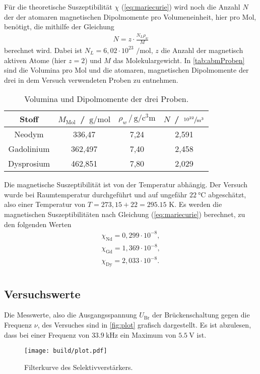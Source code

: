 \noindent
Für die theoretische Suszeptibilität $\chi$ (\ref{eq:mariecurie}) wird noch die Anzahl $N$ der der atomaren magnetischen Dipolmomente pro Volumeneinheit, hier pro Mol, benötigt, die mithilfe der Gleichung 
\begin{align*}
  N = z\cdot \frac{N_L \rho_w}{M}
\end{align*}
berechnet wird. Dabei ist $N_L = 6,02 \cdot 10^{23}$ $\si{\per\mole}$, $z$ die Anzahl der magnetisch aktiven Atome (hier $z=2$) und $M$ das Molekulargewicht.
In \autoref{tab:abmProben} sind die Volumina pro Mol und die atomaren, magnetischen Dipolmomente der drei in dem Versuch verwendeten Proben zu entnehmen.
\begin{table}[H]
  \centering
  \caption{Volumina und Dipolmomente der drei Proben.}
  \label{tab:abmProben}
  \begin{tabular}{c|c c c}
    \toprule
    Stoff & $M_{\text{Mol}}$ \,/\, $\si{\gram\per\mole}$ & $\rho_w \, / \, \si{\gram\per\cubic\centi\meter}$ & $N$ \,/\, $\sfrac{10^{22}}{\si{\cubic\meter}}$ \\
    \midrule
    Neodym & 336,47 & 7,24 & 2,591 \\
    Gadolinium & 362,497 & 7,40 & 2,458 \\
    Dysprosium & 462,851 & 7,80 & 2,029 \\
    \bottomrule
  \end{tabular}
\end{table}

\noindent
Die magnetische Suszeptibilität ist von der Temperatur abhängig. Der Versuch wurde bei Raumtemperatur durchgeführt und auf ungefähr $\SI{22}{\degreeCelsius}$ abgeschätzt, also einer Temperatur von $T = 273,15 + 22 = 295.15$ K.
Es werden die magnetischen Suszeptibilitäten nach Gleichung (\ref{eq:mariecurie}) berechnet, zu den folgenden Werten
\begin{align*}
  \chi_{\text{Nd}} = 0,299 \cdot 10^{-8},  \\
  \chi_{\text{Gd}} = 1,369 \cdot 10^{-8}, \\
  \chi_{\text{Dy}} = 2,033 \cdot 10^{-8}. \\
\end{align*}






\subsection{Versuchswerte}
\label{subsec:versuchsW}
Die Messwerte, also die Ausgangsspannung $U_{\text{Br}}$ der Brückenschaltung gegen die Frequenz $\nu$, des Versuches sind in \autoref{fig:plot} grafisch dargestellt.
Es ist abzulesen, dass bei einer Frequenz von $\SI{33,9}{\kilo\hertz}$ ein Maximum von $\SI{5,5}{\volt}$ ist. 
\begin{figure}[H]
  \centering
  \texttt{[image: build/plot.pdf]}
  \caption{Filterkurve des Selektivverstärkers.}
  \label{fig:plot}
\end{figure}

